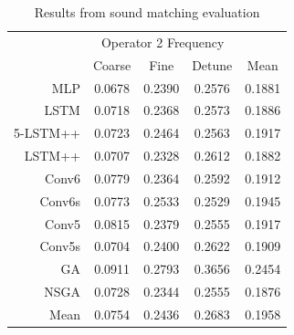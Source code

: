 \begin{table}[ht]
\centering
\begin{tabular}{r|ccc|c}
\toprule
{} & \multicolumn{3}{c}{Operator 2 Frequency} & {} \\
{} & Coarse & Fine & Detune & Mean \\
\midrule
MLP      &    0.0678 &  0.2390 &      0.2576 & 0.1881 \\
LSTM     &    0.0718 &  0.2368 &      0.2573 & 0.1886 \\
5-LSTM++ &    0.0723 &  0.2464 &      0.2563 & 0.1917 \\
LSTM++   &    0.0707 &  0.2328 &      0.2612 & 0.1882 \\
Conv6    &    0.0779 &  0.2364 &      0.2592 & 0.1912 \\
Conv6s   &    0.0773 &  0.2533 &      0.2529 & 0.1945 \\
Conv5    &    0.0815 &  0.2379 &      0.2555 & 0.1917 \\
Conv5s   &    0.0704 &  0.2400 &      0.2622 & 0.1909 \\
GA       &    0.0911 &  0.2793 &      0.3656 & 0.2454 \\
NSGA     &    0.0728 &  0.2344 &      0.2555 & 0.1876 \\
\midrule
Mean     &    0.0754 &  0.2436 &      0.2683 & 0.1958 \\
\bottomrule
\end{tabular}
\caption{Results from sound matching evaluation}
\label{tbl:param_eval_osc}
\end{table}


